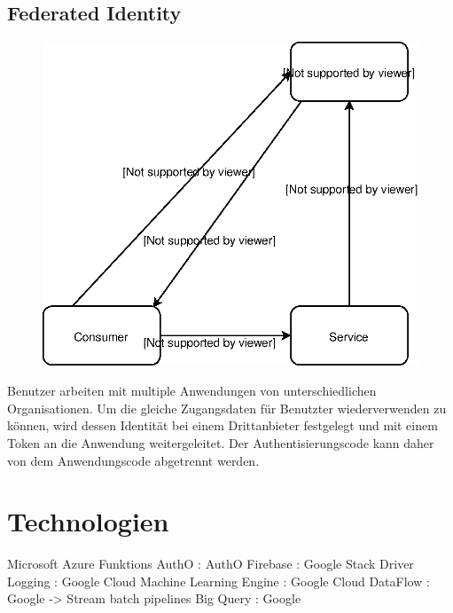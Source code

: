 \documentclass[
12pt,
english,
ngerman,
headsepline,
twoside,
openright,
numbers=noenddot,version=first
]{scrreprt}
\begin{document}
\subsection{Federated Identity}
\begin{figure}
	\includegraphics[scale=0.36]{./pics/pattern-federated-identity.eps}
\end{figure}
Benutzer arbeiten mit multiple Anwendungen von unterschiedlichen Organisationen. Um die gleiche Zugangsdaten für Benutzter wiederverwenden zu können, wird dessen Identität bei einem Drittanbieter festgelegt und mit einem Token an die Anwendung weitergeleitet. Der Authentisierungscode kann daher von dem Anwendungscode abgetrennt werden.


\section{Technologien}
Microsoft Azure Funktions 
AuthO : AuthO
Firebase : Google
Stack Driver Logging : Google
Cloud Machine Learning Engine : Google
Cloud DataFlow : Google -> Stream batch pipelines
Big Query : Google




\end{document}
